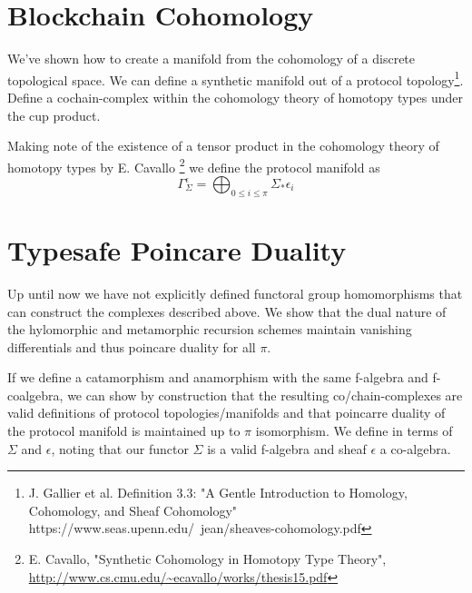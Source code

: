 \documentclass{article}
\begin{document}
\section{Blockchain Cohomology}
We've shown how to create a manifold from the cohomology of a discrete topological space.  We can define a synthetic manifold out of a protocol topology\footnote{J. Gallier et al. Definition 3.3: "A Gentle Introduction to Homology, Cohomology, and
Sheaf Cohomology" https://www.seas.upenn.edu/~jean/sheaves-cohomology.pdf}. Define a cochain-complex within the cohomology theory of homotopy types under the cup product.

Making note of the existence of a tensor product in the cohomology theory of homotopy types by E. Cavallo \footnote{E. Cavallo, "Synthetic Cohomology in Homotopy Type Theory", \url{http://www.cs.cmu.edu/~ecavallo/works/thesis15.pdf}} we define the protocol manifold as 
\begin{equation} \label{eq1}
\Gamma^\epsilon_{\Sigma} = \bigoplus_{0 \leq i \leq \pi} \Sigma_* \epsilon_i
\end{equation} \label{eq1}

\section{Typesafe Poincare Duality}
Up until now we have not explicitly defined functoral group homomorphisms that can construct the complexes described above. We show that the dual nature of the hylomorphic and metamorphic recursion schemes maintain vanishing differentials and thus poincare duality for all $\pi$.

If we define a catamorphism and anamorphism with the same f-algebra and f-coalgebra, we can show by construction that the resulting co/chain-complexes are valid definitions of protocol topologies/manifolds and that poincarre duality of the protocol manifold is maintained up to $\pi$ isomorphism. We define in terms of $\Sigma$ and $\epsilon$, noting that our functor $\Sigma$ is a valid f-algebra and sheaf $\epsilon$ a co-algebra.
\end{document}

